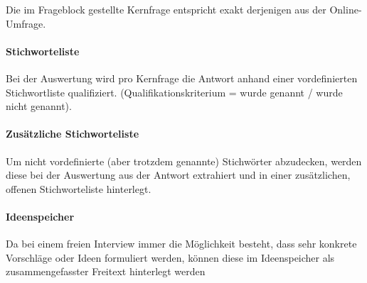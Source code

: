 \documentclass[../../main.tex]{subfiles}
\begin{document}
\begin{sloppypar}
Die im Frageblock gestellte Kernfrage entspricht exakt derjenigen aus der Online-Umfrage.
\end{sloppypar}

\paragraph*{Stichworteliste}\mbox{}

\begin{sloppypar}
Bei der Auswertung wird pro Kernfrage die Antwort anhand einer vordefinierten Stichwortliste qualifiziert. (Qualifikationskriterium = wurde genannt / wurde nicht genannt).
\end{sloppypar}

\paragraph*{Zusätzliche Stichworteliste}\mbox{}

\begin{sloppypar}
Um nicht vordefinierte (aber trotzdem genannte) Stichwörter abzudecken, werden diese bei der Auswertung aus der Antwort extrahiert und in einer zusätzlichen, offenen Stichworteliste hinterlegt.
\end{sloppypar}

\paragraph*{Ideenspeicher}\mbox{}

\begin{sloppypar}
Da bei einem freien Interview immer die Möglichkeit besteht, dass sehr konkrete Vorschläge oder Ideen formuliert werden, können diese im Ideenspeicher als zusammengefasster Freitext hinterlegt werden
\end{sloppypar}
\end{document}
